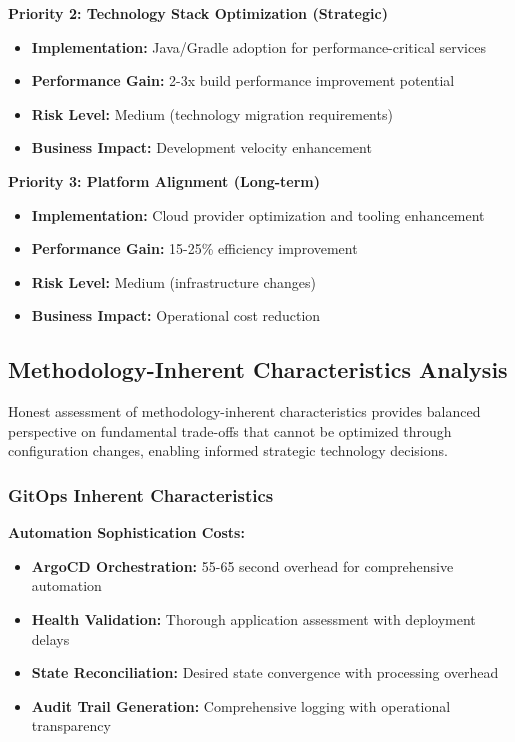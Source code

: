 \textbf{Priority 2: Technology Stack Optimization (Strategic)}
\begin{itemize}
\item \textbf{Implementation:} Java/Gradle adoption for performance-critical services
\item \textbf{Performance Gain:} 2-3x build performance improvement potential
\item \textbf{Risk Level:} Medium (technology migration requirements)
\item \textbf{Business Impact:} Development velocity enhancement
\end{itemize}

\textbf{Priority 3: Platform Alignment (Long-term)}
\begin{itemize}
\item \textbf{Implementation:} Cloud provider optimization and tooling enhancement
\item \textbf{Performance Gain:} 15-25\% efficiency improvement
\item \textbf{Risk Level:} Medium (infrastructure changes)
\item \textbf{Business Impact:} Operational cost reduction
\end{itemize}

\subsection{Methodology-Inherent Characteristics Analysis}
\label{subsec:methodology_characteristics}

Honest assessment of methodology-inherent characteristics provides balanced perspective on fundamental trade-offs that cannot be optimized through configuration changes, enabling informed strategic technology decisions.

\subsubsection{GitOps Inherent Characteristics}

\textbf{Automation Sophistication Costs:}
\begin{itemize}
\item \textbf{ArgoCD Orchestration:} 55-65 second overhead for comprehensive automation
\item \textbf{Health Validation:} Thorough application assessment with deployment delays
\item \textbf{State Reconciliation:} Desired state convergence with processing overhead
\item \textbf{Audit Trail Generation:} Comprehensive logging with operational transparency
\end{itemize}

